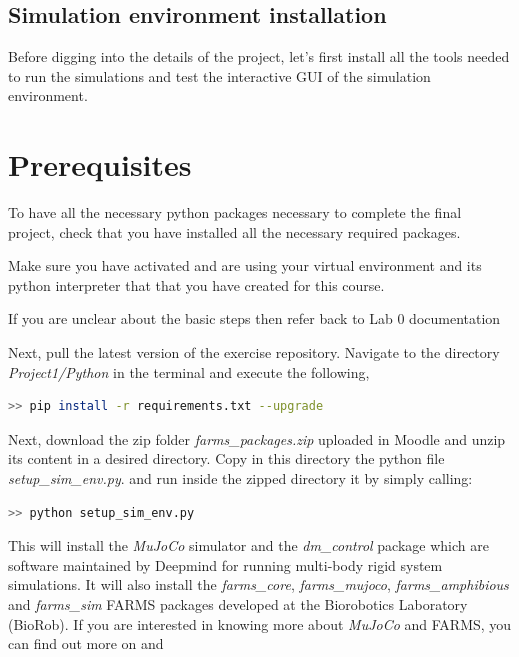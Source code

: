 \documentclass{cmc}
\begin{document}
\subsection*{Simulation environment installation}

Before digging into the details of the project, let's first install all the tools
needed to run the simulations and test the interactive GUI of the simulation environment.


\section*{Prerequisites}
To have all the necessary python packages necessary to complete the
final project, check that you have installed all the necessary required packages.

 Make sure you have activated and are using your
virtual environment and its python interpreter that that you have created for
this course.

 If you are unclear about the basic steps then refer back
to Lab 0 documentation

Next, pull the latest version of the exercise repository. Navigate to the
directory \textit{Project1/Python} in the terminal and execute the following,

\begin{lstlisting}[language=Bash]
  >> pip install -r requirements.txt --upgrade
\end{lstlisting}

Next, download the zip folder \textit{farms\_packages.zip} uploaded in Moodle and unzip its content
in a desired directory. Copy in this directory the python file \textit{setup\_sim\_env.py}.
and run inside the zipped directory it by simply calling:

\label{sec:mujoco-inst}
\begin{lstlisting}[language=Bash]
  >> python setup_sim_env.py
\end{lstlisting}

This will install the \textit{MuJoCo} simulator and the \textit{dm\_control}
package which are software maintained by Deepmind for running multi-body rigid system
simulations. It will also install the \textit{farms\_core},
\textit{farms\_mujoco}, \textit{farms\_amphibious} and \textit{farms\_sim} FARMS packages developed at the
Biorobotics Laboratory (BioRob). If you are interested in knowing more about
\textit{MuJoCo} and FARMS, you can find out more on \href{https://mujoco.org/}{} and \href{https://www.biorxiv.org/content/10.1101/2023.09.25.559130v1https://www.biorxiv.org/content/10.1101/2023.09.25.559130v1}{}
\end{document}
